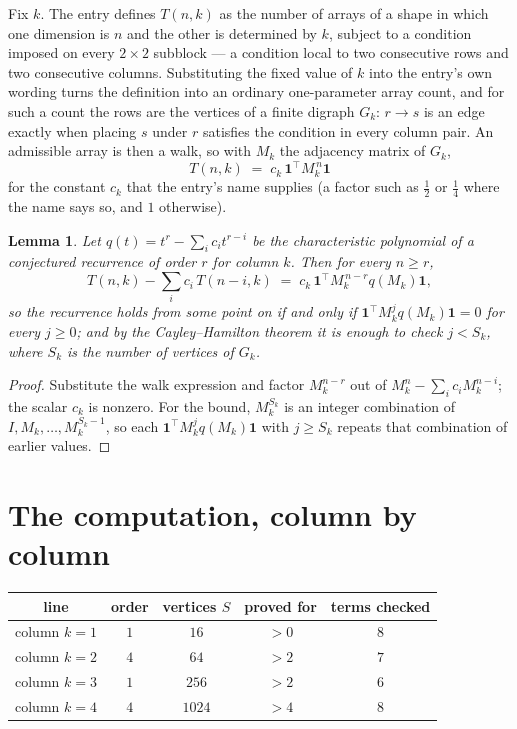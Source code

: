 \documentclass[11pt,a4paper]{article}
\theoremstyle{plain}
\newtheorem{lemma}[theorem]{Lemma}
\theoremstyle{definition}
\begin{document}
Fix $k$. The entry defines $T(n,k)$ as the number of arrays of a shape in which one dimension
is $n$ and the other is determined by $k$, subject to a condition imposed on every
$2\times2$ subblock --- a condition local to two consecutive rows and two consecutive columns.
Substituting the fixed value of $k$ into the entry's own wording turns the definition into an
ordinary one-parameter array count, and for such a count the rows are the vertices of a finite
digraph $G_k$: $r\to s$ is an edge exactly when placing $s$ under $r$ satisfies the condition
in every column pair. An admissible array is then a walk, so with $M_k$ the adjacency matrix
of $G_k$,
\[
T(n,k)\;=\;c_k\,\mathbf{1}^{\!\top}M_k^{\,n}\mathbf{1}
\]
for the constant $c_k$ that the entry's name supplies (a factor such as $\tfrac12$ or
$\tfrac14$ where the name says so, and $1$ otherwise).

\begin{lemma}\label{lem:crit}
Let $q(t)=t^{r}-\sum_i c_it^{r-i}$ be the characteristic polynomial of a conjectured
recurrence of order $r$ for column $k$. Then for every $n\ge r$,
\[
T(n,k)-\sum_i c_i\,T(n-i,k)\;=\;c_k\,\mathbf{1}^{\!\top}M_k^{\,n-r}q(M_k)\mathbf{1},
\]
so the recurrence holds from some point on if and only if
$\mathbf{1}^{\!\top}M_k^{j}q(M_k)\mathbf{1}=0$ for every $j\ge0$; and by the
Cayley--Hamilton theorem it is enough to check $j<S_k$, where $S_k$ is the number of vertices
of $G_k$.
\end{lemma}

\begin{proof}
Substitute the walk expression and factor $M_k^{n-r}$ out of $M_k^{n}-\sum_ic_iM_k^{n-i}$;
the scalar $c_k$ is nonzero. For the bound, $M_k^{S_k}$ is an integer combination of
$I,M_k,\dots,M_k^{S_k-1}$, so each $\mathbf{1}^{\!\top}M_k^{j}q(M_k)\mathbf{1}$ with
$j\ge S_k$ repeats that combination of earlier values.
\end{proof}

\section{The computation, column by column}

\begin{center}
\begin{tabular}{ccccc}
line & order & vertices $S$ & proved for & terms checked \\ \hline
column $k$$=1$ & $1$ & $16$ & $>0$ & $8$ \\
column $k$$=2$ & $4$ & $64$ & $>2$ & $7$ \\
column $k$$=3$ & $1$ & $256$ & $>2$ & $6$ \\
column $k$$=4$ & $4$ & $1024$ & $>4$ & $8$ \\
\end{tabular}
\end{center}
\end{document}
